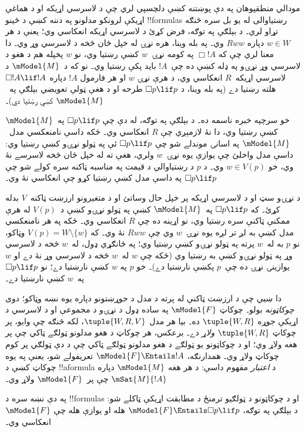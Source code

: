 \documentclass[../../../include/open-logic-section]{subfiles}
\begin{document}


مودالي منطقپوهان په دې پوښتنه کښې دلچسپي لري چې د لاسرسي اړيکه او
د هماغې اړيکې لرونکو مدلونو په دننه کښې د ځينو !!{formula}s رښتياوالی
له يو بل سره څنګه تړاو لري۔ د بېلګې په توګه، فرض کړئ د لاسرسي اړيکه
انعکاسي وي؛ يعنې د هر $w \in W$ دپاره $Rww$ وي۔ په بله وينا، هره
نړۍ له خپل ځان څخه د لاسرسي وړ وي۔ دا معنا لري چې که $\Box !A$ په
کومه نړۍ~$w$ کښې رښتيا وي، نو $w$ پخپله هم د هغو د لاسرسي وړ نړۍو
په ډله کښې ده چې~$!A$ بايد پکې رښتيا وي۔ نو که د~$\mModel{M}$ د
لاسرسي اړيکه~$R$ انعکاسي وي، د هرې نړۍ $w$ او هر فارمول $!A$ دپاره
$\Box !A \lif !A$ هلته رښتيا دے (په بله وينا، د $\Box p \lif p$
طرحه او د هغې ټولې تعويضي بېلګې په~$\mModel{M}$ کښې رښتيا دي)۔

خو سرچپه خبره ناسمه ده۔ د بېلګې په توګه، له دې چې $\Box p \lif p$
په~$\mModel{M}$ کښې رښتيا وي، دا نۀ لازمېږي چې $R$ انعکاسي وي۔
ځکه داسې نامنعکسي مدل~$\mModel{M}$ په اسانۍ موندلے شو چې $\Box p
\lif p$ ئې په ټولو نړۍو کښې رښتيا وي: داسې مدل واخلئ چې يوازې يوه
نړۍ~$w$ ولري، هغې ته له خپل ځان څخه لاسرسے نۀ وي، خو $w \in V(p)$
وي۔ د $p$ د رښتياوالي د قيمت په مناسبه ټاکنه سره کولے شو چې
$\Box p \lif p$ په داسې مدل کښې رښتيا کړو چې انعکاسي نۀ وي۔

د نړۍو سټ او د لاسرسي اړيکه پر خپل حال وساتئ او د متغيرونو ارزښت
ټاکنه~$V$ بدله کړئ۔ که $\Box p \lif p$ په~$\mModel{M}$ کښې په ټولو
نړۍو کښې د~$V(p)$ له هرې ممکنې ټاکنې سره رښتيا وي، نو اړينه ده چې
$R$ انعکاسي وي۔ ځکه په هر نامنعکسي مدل کښې به لږ تر لږه يوه نړۍ~$w$
وي چې $Rww$ نۀ وي۔ که $V(p) = W \setminus \{w\}$ وټاکو، نو $p$
به له~$w$ پرته په ټولو نړۍو کښې رښتيا وي؛ په ځانګړي ډول، له~$w$
څخه د لاسرسي وړ په ټولو نړۍو کښې به رښتيا وي (ځکه چې $w$ له~$w$
څخه د لاسرسي وړ نۀ دے او $w$ يوازينۍ نړۍ ده چې~$p$ پکښې نارښتيا دے)۔
خو $p$ په $w$ کښې نارښتيا دے؛ نو $\Box p \lif p$ په~$w$ کښې
نارښتيا دے۔

دا ښيي چې د ارزښت ټاکنې له پرته د مدل د جوړښتونو دپاره يوه نښه
وټاکو؛ دوى \emph{چوکاټونه} بولو۔ چوکاټ $\mModel{F}$ په ساده ډول د
نړۍو د مجموعې او د لاسرسي د اړيکې جوړه $\tuple{W, R}$ ده۔ بيا هر
مدل $\tuple{W, R, V}$، لکه څنګه چې وايو،
پر چوکاټ $\tuple{W, R}$ \emph{ولاړ} دے۔ برعکس، هر چوکاټ د هغو
مدلونو ټولګے ټاکي چې پر هغه ولاړ وي؛ او د چوکاټونو يو ټولګے د هغو
مدلونو ټولګے ټاکي چې د دې ټولګي پر کوم چوکاټ ولاړ وي۔ همدارنګه،
$\mModel{F} \Entails !A$ تعريفولے شو، يعنې په يوه چوکاټ کښې د
!!a{formula} د \emph{اعتبار} مفهوم داسې: د هر هغه $\mModel{M}$
دپاره $\mSat{M}{!A}$ چې پر~$\mModel{F}$ ولاړ وي۔

په دې نښه سره د !!{formula}s او د چوکاټونو د ټولګيو ترمنځ د مطابقت
اړيکې ټاکلے شو: د بېلګې په توګه، $\mModel{F} \Entails \Box p \lif p$
هله او يوازې هله چې $\mModel{F}$ انعکاسي وي۔
\end{document}
